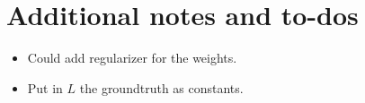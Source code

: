 \documentclass[english,11pt,a4paper]{article}
\begin{document}
%
%
%
%
%
%
%

\section{Additional notes and to-dos}

\begin{itemize}
	\item Could add regularizer for the weights.
	\item Put in $L$ the groundtruth as constants.
\end{itemize}

{\small
  
  
}
\end{document}
